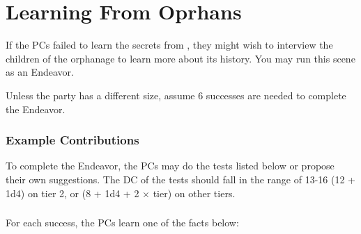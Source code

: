 \section{Learning From Oprhans}
\label{sec:learnFromKids}

If the PCs failed to learn the secrets from \npcDoctor{}, they might wish to interview the children of the orphanage to learn more about its history. You may run this scene as an Endeavor.

Unless the party has a different size, assume 6 successes are needed to complete the Endeavor.


\subsubsection{Example Contributions}

To complete the Endeavor, the PCs may do the tests listed below or propose their own suggestions. The DC of the tests should fall in the range of 13-16 (12 + 1d4) on tier 2, or (8 + 1d4 + 2 $\times$ tier) on other tiers.







\subsubsection{\pursuitResolveHeader}

For each success, the PCs learn one of the facts below:

